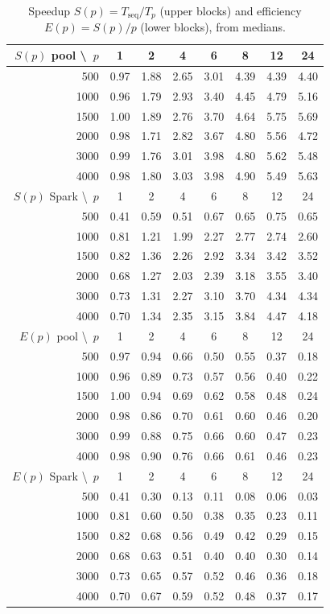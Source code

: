 \documentclass[11pt,a4paper]{article}
\begin{document}
\begin{table}[htbp]
\centering
\caption{Speedup $S(p) = T_{\mathrm{seq}}/T_p$ (upper blocks) and
efficiency $E(p) = S(p)/p$ (lower blocks), from medians.}
\label{tab:speedup}
\footnotesize
\begin{tabular}{rccccccc}
\toprule
$S(p)$ pool \textbackslash\ $p$ & 1 & 2 & 4 & 6 & 8 & 12 & 24 \\
\midrule
500  & 0.97 & 1.88 & 2.65 & 3.01 & 4.39 & 4.39 & 4.40 \\
1000 & 0.96 & 1.79 & 2.93 & 3.40 & 4.45 & 4.79 & 5.16 \\
1500 & 1.00 & 1.89 & 2.76 & 3.70 & 4.64 & 5.75 & 5.69 \\
2000 & 0.98 & 1.71 & 2.82 & 3.67 & 4.80 & 5.56 & 4.72 \\
3000 & 0.99 & 1.76 & 3.01 & 3.98 & 4.80 & 5.62 & 5.48 \\
4000 & 0.98 & 1.80 & 3.03 & 3.98 & 4.90 & 5.49 & 5.63 \\
\midrule
$S(p)$ Spark \textbackslash\ $p$ & 1 & 2 & 4 & 6 & 8 & 12 & 24 \\
\midrule
500  & 0.41 & 0.59 & 0.51 & 0.67 & 0.65 & 0.75 & 0.65 \\
1000 & 0.81 & 1.21 & 1.99 & 2.27 & 2.77 & 2.74 & 2.60 \\
1500 & 0.82 & 1.36 & 2.26 & 2.92 & 3.34 & 3.42 & 3.52 \\
2000 & 0.68 & 1.27 & 2.03 & 2.39 & 3.18 & 3.55 & 3.40 \\
3000 & 0.73 & 1.31 & 2.27 & 3.10 & 3.70 & 4.34 & 4.34 \\
4000 & 0.70 & 1.34 & 2.35 & 3.15 & 3.84 & 4.47 & 4.18 \\
\midrule
$E(p)$ pool \textbackslash\ $p$ & 1 & 2 & 4 & 6 & 8 & 12 & 24 \\
\midrule
500  & 0.97 & 0.94 & 0.66 & 0.50 & 0.55 & 0.37 & 0.18 \\
1000 & 0.96 & 0.89 & 0.73 & 0.57 & 0.56 & 0.40 & 0.22 \\
1500 & 1.00 & 0.94 & 0.69 & 0.62 & 0.58 & 0.48 & 0.24 \\
2000 & 0.98 & 0.86 & 0.70 & 0.61 & 0.60 & 0.46 & 0.20 \\
3000 & 0.99 & 0.88 & 0.75 & 0.66 & 0.60 & 0.47 & 0.23 \\
4000 & 0.98 & 0.90 & 0.76 & 0.66 & 0.61 & 0.46 & 0.23 \\
\midrule
$E(p)$ Spark \textbackslash\ $p$ & 1 & 2 & 4 & 6 & 8 & 12 & 24 \\
\midrule
500  & 0.41 & 0.30 & 0.13 & 0.11 & 0.08 & 0.06 & 0.03 \\
1000 & 0.81 & 0.60 & 0.50 & 0.38 & 0.35 & 0.23 & 0.11 \\
1500 & 0.82 & 0.68 & 0.56 & 0.49 & 0.42 & 0.29 & 0.15 \\
2000 & 0.68 & 0.63 & 0.51 & 0.40 & 0.40 & 0.30 & 0.14 \\
3000 & 0.73 & 0.65 & 0.57 & 0.52 & 0.46 & 0.36 & 0.18 \\
4000 & 0.70 & 0.67 & 0.59 & 0.52 & 0.48 & 0.37 & 0.17 \\
\bottomrule
\end{tabular}
\end{table}
\end{document}
